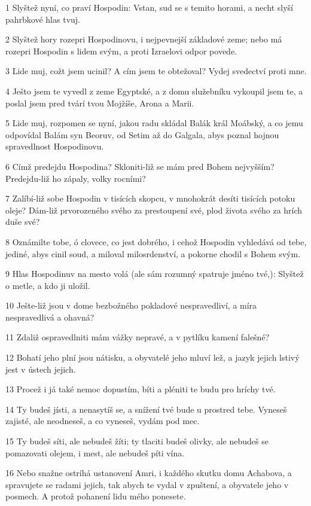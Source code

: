 \par 1 Slyštež nyní, co praví Hospodin: Vstan, sud se s temito horami, a necht slyší pahrbkové hlas tvuj.
\par 2 Slyštež hory rozepri Hospodinovu, i nejpevnejší základové zeme; nebo má rozepri Hospodin s lidem svým, a proti Izraelovi odpor povede.
\par 3 Lide muj, cožt jsem ucinil? A cím jsem te obtežoval? Vydej svedectví proti mne.
\par 4 Ješto jsem te vyvedl z zeme Egyptské, a z domu služebníku vykoupil jsem te, a poslal jsem pred tvárí tvou Mojžíše, Arona a Marii.
\par 5 Lide muj, rozpomen se nyní, jakou radu skládal Balák král Moábský, a co jemu odpovídal Balám syn Beoruv, od Setim až do Galgala, abys poznal hojnou spravedlnost Hospodinovu.
\par 6 Címž predejdu Hospodina? Skloniti-liž se mám pred Bohem nejvyšším? Predejdu-liž ho zápaly, volky rocními?
\par 7 Zalíbí-liž sobe Hospodin v tisících skopcu, v mnohokrát desíti tisících potoku oleje? Dám-liž prvorozeného svého za prestoupení své, plod života svého za hrích duše své?
\par 8 Oznámilte tobe, ó clovece, co jest dobrého, i cehož Hospodin vyhledává od tebe, jediné, abys cinil soud, a miloval milosrdenství, a pokorne chodil s Bohem svým.
\par 9 Hlas Hospodinuv na mesto volá (ale sám rozumný spatruje jméno tvé,): Slyštež o metle, a kdo ji uložil.
\par 10 Ješte-liž jsou v dome bezbožného pokladové nespravedliví, a míra nespravedlivá a ohavná?
\par 11 Zdaliž ospravedlniti mám vážky nepravé, a v pytlíku kamení falešné?
\par 12 Bohatí jeho plní jsou nátisku, a obyvatelé jeho mluví lež, a jazyk jejich lstivý jest v ústech jejich.
\par 13 Procež i já také nemoc dopustím, bíti a pléniti te budu pro hríchy tvé.
\par 14 Ty budeš jísti, a nenasytíš se, a snížení tvé bude u prostred tebe. Vyneseš zajisté, ale neodneseš, a co vyneseš, vydám pod mec.
\par 15 Ty budeš síti, ale nebudeš žíti; ty tlaciti budeš olivky, ale nebudeš se pomazovati olejem, i mest, ale nebudeš píti vína.
\par 16 Nebo snažne ostríhá ustanovení Amri, i každého skutku domu Achabova, a spravujete se radami jejich, tak abych te vydal v zpuštení, a obyvatele jeho v posmech. A protož pohanení lidu mého ponesete.

